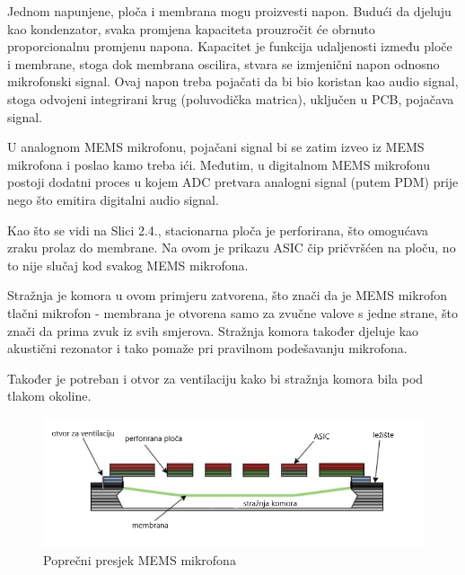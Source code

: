 Jednom napunjene, ploča i membrana mogu proizvesti napon. Budući da djeluju kao kondenzator, svaka promjena kapaciteta prouzročit će obrnuto proporcionalnu promjenu napona. Kapacitet je funkcija udaljenosti između ploče i membrane, stoga dok membrana oscilira, stvara se izmjenični napon odnosno mikrofonski signal. Ovaj napon treba pojačati da bi bio koristan kao audio signal, stoga odvojeni integrirani krug (poluvodička matrica), uključen u PCB, pojačava signal.

U analognom MEMS mikrofonu, pojačani signal bi se zatim izveo iz MEMS mikrofona i poslao kamo treba ići. Međutim, u digitalnom MEMS mikrofonu postoji dodatni proces u kojem ADC pretvara analogni signal (putem PDM) prije nego što emitira digitalni audio signal.

Kao što se vidi na Slici 2.4., stacionarna ploča je perforirana, što omogućava zraku prolaz do membrane. Na ovom je prikazu ASIC čip pričvršćen na ploču, no to nije slučaj kod svakog MEMS mikrofona. 

Stražnja je komora u ovom primjeru zatvorena, što znači da je MEMS mikrofon tlačni mikrofon - membrana je otvorena samo za zvučne valove s jedne strane, što znači da prima zvuk iz svih smjerova. Stražnja komora također djeluje kao akustični rezonator i tako pomaže pri pravilnom podešavanju mikrofona.

Također je potreban i otvor za ventilaciju kako bi stražnja komora bila pod tlakom okoline.

\begin{figure}[ht]
	\includegraphics[width=\linewidth]{imgs/mems_mic}
	\caption{Poprečni presjek MEMS mikrofona}
	\label{fig:mems-mic}
\end{figure}